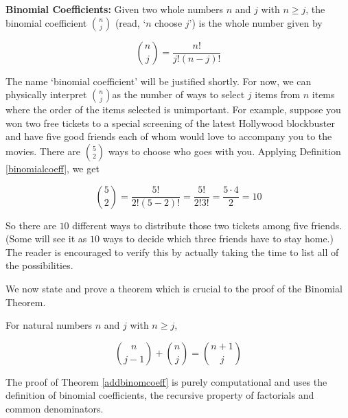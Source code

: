 \documentclass{ximera}
\begin{document}
 


\begin{definition} \label{binomialcoeff}  \textbf{Binomial Coefficients:}  Given two whole numbers $n$ and $j$ with $n \geq j$, the  binomial coefficient  {\boldmath $\displaystyle \binom{n}{j}$} (read, `$n$ choose $j$') is the whole number given by

\[ \binom{n}{j} = \frac{n!}{j! (n-j)!} \]

\end{definition}

 
 
The name `binomial coefficient' will be justified shortly.  For now, we can physically interpret $\binom{n}{j}$as the number of ways to select $j$ items from $n$ items where the order of the items selected is unimportant.   For example, suppose you won two free tickets to a special screening of the latest Hollywood blockbuster and have five good friends each of whom would love to accompany you to the movies.  There are $\binom{5}{2}$ ways to choose who goes with you.  Applying Definition \ref{binomialcoeff}, we get

\[ \binom{5}{2} = \frac{5!}{2! (5-2)!} = \frac{5!}{2! 3!} = \frac{5 \cdot 4}{2} = 10\] 

So there are $10$ different ways to distribute those two tickets among five friends. (Some will see it as $10$ ways to decide which three friends have to stay home.)  The reader is encouraged to verify this by actually taking the time to list all of the possibilities.  

 



We now state and prove a theorem which is crucial to the proof of the Binomial Theorem.

 


\begin{theorem}  \label{addbinomcoeff}  For natural numbers $n$ and $j$ with $n \geq j$, 

\[ \binom{n}{j-1} + \binom{n}{j} = \binom{n+1}{j} \]



\end{theorem}


 

The proof of Theorem \ref{addbinomcoeff} is purely computational and uses the definition of binomial coefficients, the recursive property of factorials and common denominators.
\end{document}
